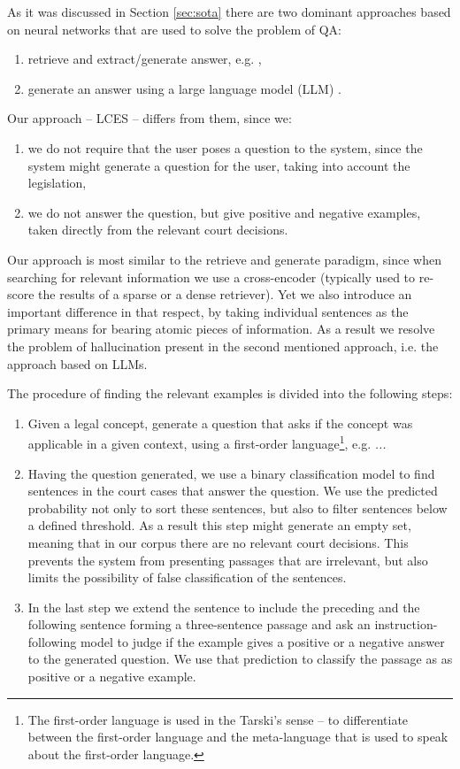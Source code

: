 As it was discussed in Section \ref{sec:sota} there are two dominant approaches 
based on neural networks that are used to solve the problem of QA:
\begin{enumerate}
  \item retrieve and extract/generate answer, e.g. \cite{}, %
  \item generate an answer using a large language model (LLM) \cite{}. %
\end{enumerate}

Our approach -- LCES -- differs from them, since we:
\begin{enumerate}
  \item we do not require that the user poses a question to the system, since the system might generate a question for the user,
    taking into account the legislation,
  \item we do not answer the question, but give positive and negative examples, taken directly from the relevant court decisions.
\end{enumerate}
Our approach is most similar to the retrieve and generate paradigm, since when searching for relevant information we use
a cross-encoder (typically used to re-score the results of a sparse or a dense retriever). Yet we also introduce an important
difference in that respect, by taking individual sentences as the primary means for bearing atomic pieces of information.  
As a result we resolve the problem of hallucination present in the second mentioned approach, i.e. the approach based on LLMs.

The procedure of finding the relevant examples is divided into the following steps:
\begin{enumerate}
  \item Given a legal concept, generate a question that asks if the concept was applicable in a given context,
    using a first-order language\footnote{The first-order language is used in the Tarski's sense -- to differentiate
    between the first-order language and the meta-language that is used to speak about the first-order language.}, e.g. 
    \textit{...} %
  \item Having the question generated, we use a binary classification model to find sentences in the court cases that answer the question. 
    We use the predicted probability not only to sort these sentences, but also to filter sentences below a defined threshold.
    As a result this step might generate an empty set, meaning that in our corpus there are no relevant court decisions. 
    This prevents the system from presenting passages that are irrelevant, but also limits the possibility of false
    classification of the sentences.
  \item In the last step we extend the sentence to include the preceding and the following sentence forming a three-sentence passage
    and ask an instruction-following model to judge if the example gives a positive or a negative answer to the generated question.
    We use that prediction to classify the passage as as positive or a negative example.
\end{enumerate}

